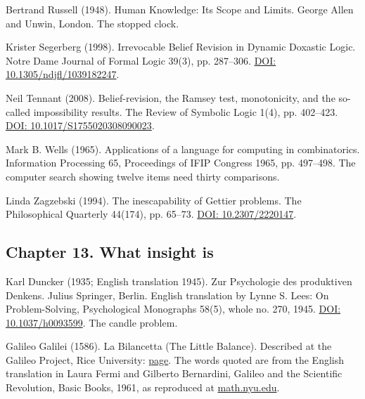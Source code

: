 \noindent Bertrand Russell (1948). Human Knowledge: Its Scope and Limits. George Allen and Unwin, London. The stopped clock.
\par\medskip

\noindent Krister Segerberg (1998). Irrevocable Belief Revision in Dynamic Doxastic Logic. Notre Dame Journal of Formal Logic 39(3), pp. 287--306. \href{https://doi.org/10.1305/ndjfl/1039182247}{DOI: 10.1305/ndjfl/1039182247}.
\par\medskip

\noindent Neil Tennant (2008). Belief-revision, the Ramsey test, monotonicity, and the so-called impossibility results. The Review of Symbolic Logic 1(4), pp. 402--423. \href{https://doi.org/10.1017/S1755020308090023}{DOI: 10.1017/S1755020308090023}.
\par\medskip

\noindent Mark B. Wells (1965). Applications of a language for computing in combinatorics. Information Processing 65, Proceedings of IFIP Congress 1965, pp. 497--498. The computer search showing twelve items need thirty comparisons.
\par\medskip

\noindent Linda Zagzebski (1994). The inescapability of Gettier problems. The Philosophical Quarterly 44(174), pp. 65--73. \href{https://doi.org/10.2307/2220147}{DOI: 10.2307/2220147}.
\par\medskip

\subsection*{Chapter 13. What insight is}

\noindent Karl Duncker (1935; English translation 1945). Zur Psychologie des produktiven Denkens. Julius Springer, Berlin. English translation by Lynne S. Lees: On Problem-Solving, Psychological Monographs 58(5), whole no. 270, 1945. \href{https://doi.org/10.1037/h0093599}{DOI: 10.1037/h0093599}. The candle problem.
\par\medskip

\noindent Galileo Galilei (1586). La Bilancetta (The Little Balance). Described at the Galileo Project, Rice University: \href{https://galileo.library.rice.edu/sci/instruments/balance.html}{page}. The words quoted are from the English translation in Laura Fermi and Gilberto Bernardini, Galileo and the Scientific Revolution, Basic Books, 1961, as reproduced at \href{https://math.nyu.edu/Archimedes/Crown/bilancetta.html}{math.nyu.edu}.
\par\medskip

